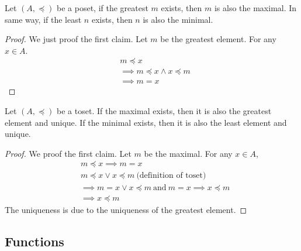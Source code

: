 \begin{proposition}{}{}
    Let $(A,\preceq)$ be a poset, if the greatest $m$ exists, then $m$ is also the maximal. In same way, if the least $n$ exists, then $n$ is also the minimal.
\end{proposition}

\begin{proof}
    We just proof the first claim. Let $m$ be the greatest element.
    For any $x \in A$.
    \begin{align*}
        &m \preceq x\\
        &\implies m \preceq x \land x \preceq m\\
        &\implies m = x
    \end{align*}
\end{proof}

\begin{theorem}{}{}
    Let $(A,\preceq)$ be a toset. If the maximal exists, then it is also the greatest element and unique. 
    If the minimal exists, then it is also the least element and unique.
\end{theorem}

\begin{proof}
    We proof the first claim. Let $m$ be the maximal. For any $x \in A$,
    \begin{align*}
        &m \preceq x \implies m = x\\
        &m \preceq x \lor x \preceq m \ \text{(definition of toset)}\\
        &\implies m = x \lor x \preceq m \ \text{and}\  m = x \implies x \preceq m\\
        &\implies x \preceq m 
    \end{align*}
    The uniqueness is due to the uniqueness of the greatest element.
\end{proof}

\subsection{Functions}


